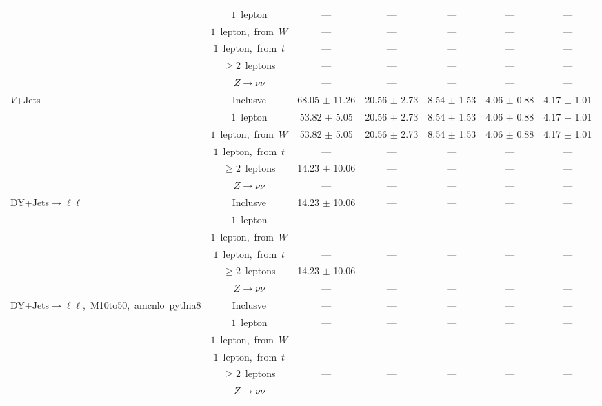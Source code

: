 \documentclass{article}
\begin{document}
\begin{longtable}{|l|c|c|c|c|c|c|}
 & $1$~lepton  & ---  & ---  & ---  & ---  & --- \\* 
 & $1$~lepton,~from~$W$  & ---  & ---  & ---  & ---  & --- \\* 
 & $1$~lepton,~from~$t$  & ---  & ---  & ---  & ---  & --- \\* 
 & $\ge2$~leptons  & ---  & ---  & ---  & ---  & --- \\* 
 & $Z\rightarrow\nu\nu$  & ---  & ---  & ---  & ---  & --- \\* 
\hline 
\multirow{6}{*}{$V$+Jets} & Inclusve  & 68.05 $\pm$ 11.26  & 20.56 $\pm$ 2.73  & 8.54 $\pm$ 1.53  & 4.06 $\pm$ 0.88  & 4.17 $\pm$ 1.01 \\* 
 & $1$~lepton  & 53.82 $\pm$ 5.05  & 20.56 $\pm$ 2.73  & 8.54 $\pm$ 1.53  & 4.06 $\pm$ 0.88  & 4.17 $\pm$ 1.01 \\* 
 & $1$~lepton,~from~$W$  & 53.82 $\pm$ 5.05  & 20.56 $\pm$ 2.73  & 8.54 $\pm$ 1.53  & 4.06 $\pm$ 0.88  & 4.17 $\pm$ 1.01 \\* 
 & $1$~lepton,~from~$t$  & ---  & ---  & ---  & ---  & --- \\* 
 & $\ge2$~leptons  & 14.23 $\pm$ 10.06  & ---  & ---  & ---  & --- \\* 
 & $Z\rightarrow\nu\nu$  & ---  & ---  & ---  & ---  & --- \\* 
\hline 
\multirow{6}{*}{DY+Jets$\rightarrow\ell\ell$} & Inclusve  & 14.23 $\pm$ 10.06  & ---  & ---  & ---  & --- \\* 
 & $1$~lepton  & ---  & ---  & ---  & ---  & --- \\* 
 & $1$~lepton,~from~$W$  & ---  & ---  & ---  & ---  & --- \\* 
 & $1$~lepton,~from~$t$  & ---  & ---  & ---  & ---  & --- \\* 
 & $\ge2$~leptons  & 14.23 $\pm$ 10.06  & ---  & ---  & ---  & --- \\* 
 & $Z\rightarrow\nu\nu$  & ---  & ---  & ---  & ---  & --- \\* 
\hline 
\multirow{6}{*}{DY+Jets$\rightarrow\ell\ell$,~M10to50,~amcnlo~pythia8} & Inclusve  & ---  & ---  & ---  & ---  & --- \\* 
 & $1$~lepton  & ---  & ---  & ---  & ---  & --- \\* 
 & $1$~lepton,~from~$W$  & ---  & ---  & ---  & ---  & --- \\* 
 & $1$~lepton,~from~$t$  & ---  & ---  & ---  & ---  & --- \\* 
 & $\ge2$~leptons  & ---  & ---  & ---  & ---  & --- \\* 
 & $Z\rightarrow\nu\nu$  & ---  & ---  & ---  & ---  & --- \\* 

\end{longtable}
\end{document}
